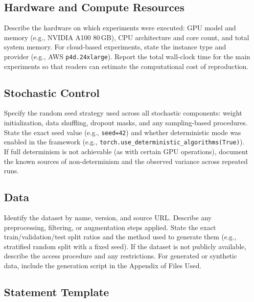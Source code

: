 \documentclass{iteso-irr}
\begin{document}
\subsection{Hardware and Compute Resources}
\label{sec:repro_hardware}

Describe the hardware on which experiments were executed: GPU model and
memory (e.g., NVIDIA A100 80\,GB), CPU architecture and core count, and
total system memory. For cloud-based experiments, state the instance type
and provider (e.g., AWS \texttt{p4d.24xlarge}). Report the total
wall-clock time for the main experiments so that readers can estimate
the computational cost of reproduction.

\subsection{Stochastic Control}
\label{sec:repro_random}

Specify the random seed strategy used across all stochastic components:
weight initialization, data shuffling, dropout masks, and any
sampling-based procedures. State the exact seed value
(e.g., \texttt{seed=42}) and whether deterministic mode was enabled in
the framework (e.g., \texttt{torch.use\_deterministic\_algorithms(True)}).
If full determinism is not achievable (as with certain GPU operations),
document the known sources of non-determinism and the observed variance
across repeated runs.

\subsection{Data}
\label{sec:repro_data}

Identify the dataset by name, version, and source URL. Describe any
preprocessing, filtering, or augmentation steps applied. State the
exact train/validation/test split ratios and the method used to
generate them (e.g., stratified random split with a fixed seed). If
the dataset is not publicly available, describe the access procedure
and any restrictions. For generated or synthetic data, include the
generation script in the Appendix of Files Used.

\subsection{Statement Template}
\label{sec:repro_template}
\end{document}

